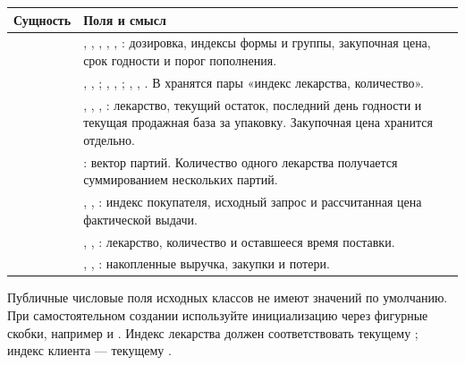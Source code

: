 {\small
\begin{longtable}{@{}L{0.21\textwidth}L{0.72\textwidth}@{}}
\toprule
Сущность & Поля и смысл \\
\midrule
\endhead
{} & , , ,
, , :
дозировка, индексы формы и группы, закупочная цена, срок годности и порог пополнения. \\
 & , , ;
, , ;
, , .
В  хранятся пары «индекс лекарства, количество». \\
 & , , ,
: лекарство, текущий остаток, последний день годности и
текущая продажная база за упаковку. Закупочная цена хранится отдельно. \\
 & : вектор партий. Количество одного лекарства
получается суммированием нескольких партий. \\
 & , , :
индекс покупателя, исходный запрос и рассчитанная цена фактической выдачи. \\
 & , , :
лекарство, количество и оставшееся время поставки. \\
 & , ,
: накопленные выручка, закупки и потери. \\
\bottomrule
\end{longtable}
}

Публичные числовые поля исходных классов не имеют значений по умолчанию.
При самостоятельном создании используйте инициализацию через фигурные скобки,
например  и .
Индекс лекарства должен соответствовать текущему ;
индекс клиента --- текущему .

